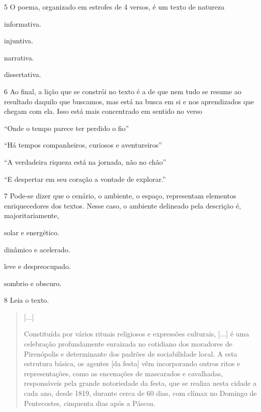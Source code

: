\num{5} O poema, organizado em estrofes de 4 versos, é um texto de
natureza

\begin{escolha}
\item
  informativa.
\item
  injuntiva.
\item
  narrativa.
\item
  dissertativa.
\end{escolha}


\num{6} Ao final, a lição que se constrói no texto é a de que nem tudo
se resume ao resultado daquilo que buscamos, mas está na busca em si e
nos aprendizados que chegam com ela. Isso está mais concentrado em
sentido no verso

\begin{escolha}
\item
  ``Onde o tempo parece ter perdido o fio''
\item
  ``Há tempos companheiros, curiosos e aventureiros''
\item
  ``A verdadeira riqueza está na jornada, não no chão''
\item
  ``E despertar em seu coração a vontade de explorar.''
\end{escolha}

\num{7} Pode-se dizer que o cenário, o ambiente, o espaço, representam
elementos enriquecedores dos textos. Nesse caso, o ambiente delineado
pela descrição é, majoritariamente,

\begin{escolha}
\item
  solar e energético.
\item
  dinâmico e acelerado.
\item
  leve e despreocupado.
\item
  sombrio e obscuro.
\end{escolha}


\pagebreak
\num{8} Leia o texto.

\begin{quote}
{[}...{]}

Constituída por vários rituais religiosos e expressões culturais, {[}...{]} é uma celebração profundamente 
enraizada no cotidiano dos moradores de Pirenópolis e determinante dos padrões de sociabilidade local. A 
esta estrutura básica, os agentes [da festa] vêm incorporando outros ritos e representações, como as 
encenações de mascarados e cavalhadas, responsáveis pela grande notoriedade da festa, que se realiza nesta 
cidade a cada ano, desde 1819, durante cerca de 60 dias, com clímax no Domingo de Pentecostes, cinquenta 
dias após a Páscoa.

\end{quote}

